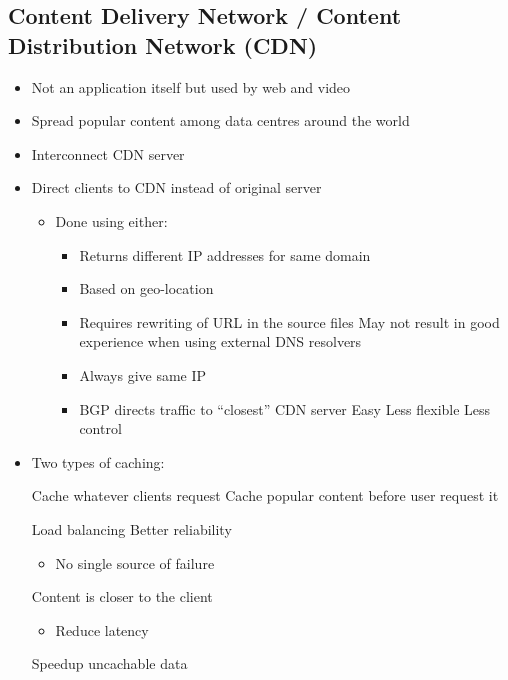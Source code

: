 \subsection{Content Delivery Network / Content Distribution Network (CDN)}
\begin{itemize}
    \item Not an application itself but used by web and video
    \item Spread popular content among data centres around the world
    \item Interconnect CDN server
    \item Direct clients to CDN instead of original server
        \begin{itemize}
            \item Done using either:
                \begin{itemize}
                        \begin{itemize}
                            \item Returns different IP addresses for same domain
                            \item Based on geo-location
                            \item Requires rewriting of URL in the source files
                            \icon May not result in good experience when using external DNS resolvers
                        \end{itemize}
                        \begin{itemize}
                            \item Always give same IP
                            \item BGP directs traffic to ``closest'' CDN server
                            \ipro Easy
                            \icon Less flexible
                            \icon Less control
                        \end{itemize}
                \end{itemize}
        \end{itemize}
    \item Two types of caching:
        \begin{itemize}
             Cache whatever clients request
             Cache popular content before user request it
        \end{itemize}
    \ipro Load balancing
    \ipro Better reliability
        \begin{itemize}
            \item No single source of failure
        \end{itemize}
    \ipro Content is closer to the client
        \begin{itemize}
            \item Reduce latency
        \end{itemize}
    \ipro Speedup uncachable data
\end{itemize}

